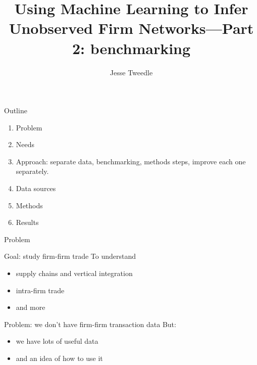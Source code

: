 \documentclass[12pt]{beamer}
\begin{document}
\title{Using Machine Learning to Infer Unobserved Firm Networks---Part 2: benchmarking}
\author{Jesse Tweedle}

\begin{frame}{}

\maketitle

\end{frame}

\begin{frame}{Outline}
\begin{enumerate}
\item Problem
\item Needs
\item Approach: separate data, benchmarking, methods steps, improve each one separately.
\item Data sources
\item Methods
\item Results
\end{enumerate}
\end{frame}

\begin{frame}{Problem}

\begin{block}{Goal: study firm-firm trade}
To understand
\begin{itemize}
\item supply chains and vertical integration
\item intra-firm trade
\item and more
\end{itemize}
\end{block}

\begin{block}{Problem: we don't have firm-firm transaction data}
But: 
\begin{itemize}
\item we have lots of useful data
\item and an idea of how to use it
\end{itemize}
\end{block}


\end{frame}
\end{document}
